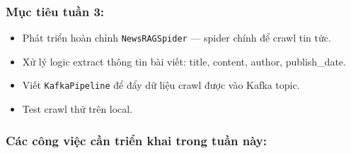\hypertarget{mux1ee5c-tiuxeau-tuux1ea7n-3}{%
\subsubsection{Mục tiêu tuần 3:}}

\begin{itemize}
\tightlist
\item
  Phát triển hoàn chỉnh \texttt{NewsRAGSpider} --- spider chính để crawl
  tin tức.
\item
  Xử lý logic extract thông tin bài viết: title, content, author,
  publish\_date.
\item
  Viết \texttt{KafkaPipeline} để đẩy dữ liệu crawl được vào Kafka topic.
\item
  Test crawl thử trên local.
\end{itemize}

\hypertarget{cuxe1c-cuxf4ng-viux1ec7c-cux1ea7n-triux1ec3n-khai-trong-tuux1ea7n-nuxe0y}{%
\subsubsection{Các công việc cần triển khai trong tuần
này:}}

